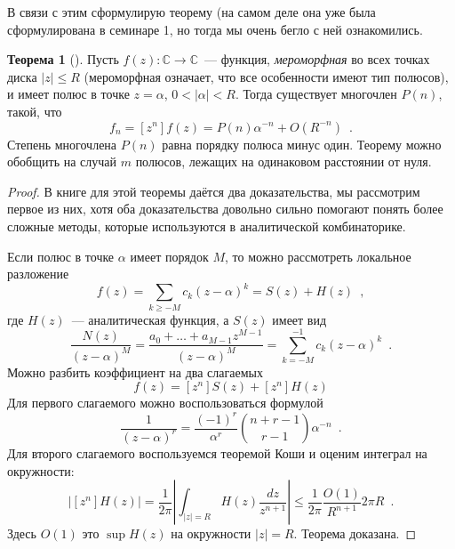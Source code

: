 \documentclass[a5paper]{article}
\def \C {\mathbb C}
\theoremstyle{definition}
\newtheorem*{theorem}{Теорема}
\def\C{\mathbb C}
\begin{document}
В связи с этим сформулирую теорему (на самом деле она уже была сформулирована в
семинаре 1, но тогда мы очень бегло с ней ознакомились.
\begin{theorem}[{\cite[Theorem IV.10, page 258]{ac}}]
	Пусть \( f(z) \colon \C \to \C \)~--- функция, \textit{мероморфная} во всех 
	точках диска \( |z| \leq R \) (мероморфная означает, что все особенности 
	имеют тип полюсов), и имеет полюс в точке \( z = \alpha \), \( 0 < |\alpha| 
	< R 
	\). Тогда существует многочлен \( P(n) \), такой, что
	\[
		f_n = [z^n] f(z) = P(n) \alpha^{-n} + O(R^{-n}) \enspace .
	\]
    Степень многочлена \( P(n) \) равна порядку полюса минус один.
	Теорему можно обобщить на случай \( m \) полюсов, лежащих на одинаковом
расстоянии от нуля.
\end{theorem}
\begin{proof}
    В книге \cite{ac} для этой теоремы даётся два доказательства, мы рассмотрим
первое из них, хотя оба доказательства довольно сильно помогают понять более
сложные методы, которые используются в аналитической комбинаторике.

Если полюс в точке \( \alpha \) имеет порядок \( M \), то можно рассмотреть
локальное разложение
\begin{equation}
    f(z) = \sum_{k \geq -M} c_{k} (z - \alpha)^k =  S(z) + H(z) \enspace ,
\end{equation}
где \( H(z) \)~--- аналитическая функция, а \( S(z) \) имеет вид
\begin{equation}
    \dfrac{N(z)}{(z - \alpha)^M} = \dfrac{ a_0 + \ldots + a_{M-1}z^{M-1} }{(z -
\alpha)^M}
    = \sum_{k = -M}^{-1} c_k (z - \alpha)^k
    \enspace .
\end{equation}
Можно разбить коэффициент на два слагаемых
\begin{equation}
    [z^n] f(z) = [z^n] S(z) + [z^n] H(z)
\end{equation}
Для первого слагаемого можно воспользоваться формулой
\begin{equation}
    [z^n] \dfrac{1}{(z - \alpha)^r} = \dfrac{(-1)^r}{\alpha^r}
    {n+r-1 \choose r-1} \alpha^{-n}
    \enspace .
\end{equation}
Для второго слагаемого воспользуемся теоремой Коши и оценим интеграл на
окружности:
\begin{equation}
    \left|
        [z^n] H(z)
    \right|
    = \dfrac{1}{2\pi}
    \left|
        \int_{|z| = R}
        H(z) \dfrac{dz}{z^{n+1}}
    \right|
    \leq
    \dfrac{1}{2\pi}
    \dfrac{O(1)}{R^{n+1}} 2 \pi R \enspace .
\end{equation}
Здесь \( O(1) \) это \( \sup H(z) \) на окружности \( |z| = R \).
Теорема доказана.
\end{proof}
\end{document}
